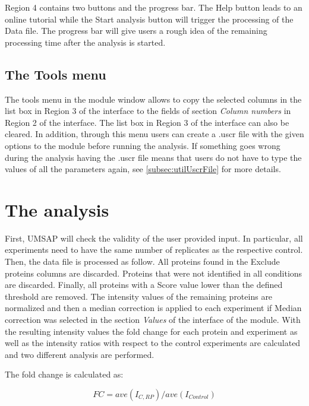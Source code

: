 Region \num{4} contains two buttons and the progress bar. The Help button leads to an online tutorial while the Start analysis button will trigger the processing of the Data file. The progress bar will give users a rough idea of the remaining processing time after the analysis is started.

\subsection{The Tools menu}

The tools menu in the module window allows to copy the selected columns in the list box in Region \num{3} of the interface to the fields of section \textit{Column numbers} in Region \num{2} of the interface. The list box in Region \num{3} of the interface can also be cleared. In addition, through this menu users can create a .uscr file with the given options to the module before running the analysis. If something goes wrong during the analysis having the .uscr file means that users do not have to type the values of all the parameters again, see \autoref{subsec:utilUscrFile} for more details.   

\section{The analysis}
\label{sec:protprofTTest}

First, UMSAP will check the validity of the user provided input. In particular, all experiments need to have the same number of replicates as the respective control. Then, the data file is processed as follow. All proteins found in the Exclude proteins columns are discarded. Proteins that were not identified in all conditions are discarded. Finally, all proteins with a Score value lower than the defined threshold are removed. The intensity values of the remaining proteins are normalized and then a median correction is applied to each experiment if Median correction was selected in the section \textit{Values} of the interface of the module. With the resulting intensity values the fold change for each protein and experiment as well as the intensity ratios with respect to the control experiments are calculated and two different analysis are performed.

The fold change is calculated as: 

\begin{equation}
\label{eq:protprofFC}
FC = ave(I_{C, RP}) / ave(I_{Control})
\end{equation}

